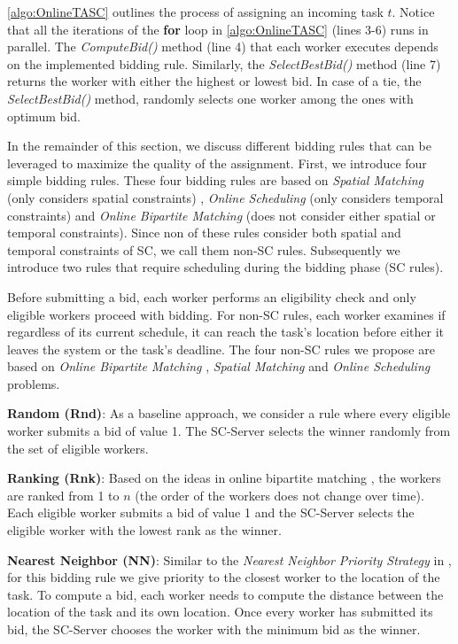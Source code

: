 \cref{algo:OnlineTASC} outlines the process of assigning an incoming task $t$. Notice that all the iterations of the \textbf{for} loop in \cref{algo:OnlineTASC} (lines 3-6) runs in parallel. The \emph{ComputeBid()} method (line 4) that each worker executes depends on the implemented bidding rule. Similarly, the \emph{SelectBestBid()} method (line 7) returns the worker with either the highest or lowest bid. In case of a tie, the \emph{SelectBestBid()} method, randomly selects one worker among the ones with optimum bid.



In the remainder of this section, we discuss different bidding rules that can be leveraged to maximize the quality of the assignment. First, we introduce four simple bidding rules. These four bidding rules are based on \emph{Spatial Matching} (only considers spatial constraints) \cite{Wong07}, \emph{Online Scheduling} (only considers temporal constraints) \cite{Lee13} and \emph{Online Bipartite Matching} \cite{Karp90} (does not consider either spatial or temporal constraints). Since non of these rules consider both spatial and temporal constraints of SC, we call them non-SC rules. Subsequently we introduce two rules that require scheduling during the bidding phase (SC rules).

Before submitting a bid, each worker performs an eligibility check and only eligible workers proceed with bidding. For non-SC rules, each worker examines if regardless of its current schedule, it can reach the task's location before either it leaves the system or the task's deadline. The four non-SC rules we propose are based on \emph{Online Bipartite Matching} \cite{Karp90}, \emph{Spatial Matching} \cite{Wong07} and \emph{Online Scheduling} \cite{Lee13} problems.

\noindent\textbf{Random (Rnd)}:
As a baseline approach, we consider a rule where every eligible worker submits a bid of value 1. The SC-Server selects the winner randomly from the set of eligible workers.

\noindent\textbf{Ranking (Rnk)}:
Based on the ideas in online bipartite matching \cite{Karp90}, the workers are ranked from 1 to $n$ (the order of the workers does not change over time). Each eligible worker submits a bid of value 1 and the SC-Server selects the eligible worker with the lowest rank as the winner.

\noindent\textbf{Nearest Neighbor (NN)}:
Similar to the \emph{Nearest Neighbor Priority Strategy} in \cite{Kazemi12}, for this bidding rule we give priority to the closest worker to the location of the task. To compute a bid, each worker needs to compute the distance between the location of the task and its own location. Once every worker has submitted its bid, the SC-Server chooses the worker with the minimum bid as the winner.

